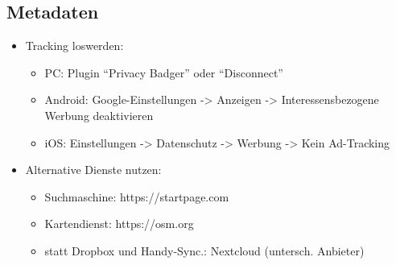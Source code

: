\documentclass[a5paper]{scrartcl}
\begin{document}
\subsection*{Metadaten}
\begin{itemize}
  \item Tracking loswerden:
  \begin{itemize}
    \item PC: Plugin ``Privacy Badger'' oder ``Disconnect''
    \item Android: Google-Einstellungen -> Anzeigen -> Interessensbezogene Werbung deaktivieren
    \item iOS: Einstellungen -> Datenschutz -> Werbung -> Kein Ad-Tracking
  \end{itemize}
  \item Alternative Dienste nutzen:
  \begin{itemize}
    \item Suchmaschine: https://startpage.com
    \item Kartendienst: https://osm.org
    \item statt Dropbox und Handy-Sync.: Nextcloud (untersch. Anbieter)
  \end{itemize}
\end{itemize}
\end{document}
